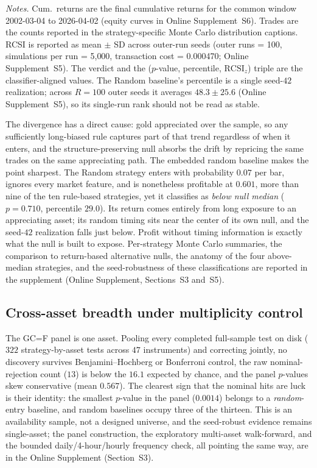 \documentclass[risks,article,submit,pdftex,oneauthor]{Definitions/mdpi}
\begin{document}
\begin{table}[t]
\begin{minipage}{0.95\textwidth}
\centering
\footnotesize\emph{Notes.} Cum.\ returns are the final cumulative returns for the common window 2002-03-04 to 2026-04-02 (equity curves in Online Supplement~S6). Trades are the counts reported in the strategy-specific Monte Carlo distribution captions. RCSI is reported as mean $\pm$ SD across outer-run seeds (outer runs = 100, simulations per run = 5{,}000, transaction cost = 0.000470; Online Supplement~S5). The verdict and the ($p$-value, percentile, $\mathrm{RCSI}_z$) triple are the classifier-aligned values. The Random baseline's percentile is a single seed-$42$ realization; across $R=100$ outer seeds it averages $48.3\pm25.6$ (Online Supplement~S5), so its single-run rank should not be read as stable.
\end{minipage}
\end{table}

The divergence has a direct cause: gold appreciated over the sample, so any sufficiently long-biased rule captures part of that trend regardless of when it enters, and the structure-preserving null absorbs the drift by repricing the same trades on the same appreciating path. The embedded random baseline makes the point sharpest. The Random strategy enters with probability $0.07$ per bar, ignores every market feature, and is nonetheless profitable at $0.601$, more than nine of the ten rule-based strategies, yet it classifies as \emph{below null median} ($p=0.710$, percentile $29.0$). Its return comes entirely from long exposure to an appreciating asset; its random timing sits near the center of its own null, and the seed-$42$ realization falls just below. Profit without timing information is exactly what the null is built to expose. Per-strategy Monte Carlo summaries, the comparison to return-based alternative nulls, the anatomy of the four above-median strategies, and the seed-robustness of these classifications are reported in the supplement (Online Supplement, Sections~S3 and~S5).

\subsection{Cross-asset breadth under multiplicity control}
\label{sec:cross-asset-multiplicity}

The GC=F panel is one asset. Pooling every completed full-sample test on disk ($322$ strategy-by-asset tests across $47$ instruments) and correcting jointly, no discovery survives Benjamini--Hochberg or Bonferroni control, the raw nominal-rejection count ($13$) is below the $16.1$ expected by chance, and the panel $p$-values skew conservative (mean $0.567$). The clearest sign that the nominal hits are luck is their identity: the smallest $p$-value in the panel ($0.0014$) belongs to a \emph{random}-entry baseline, and random baselines occupy three of the thirteen. This is an availability sample, not a designed universe, and the seed-robust evidence remains single-asset; the panel construction, the exploratory multi-asset walk-forward, and the bounded daily/4-hour/hourly frequency check, all pointing the same way, are in the Online Supplement (Section~S3).
\end{document}
